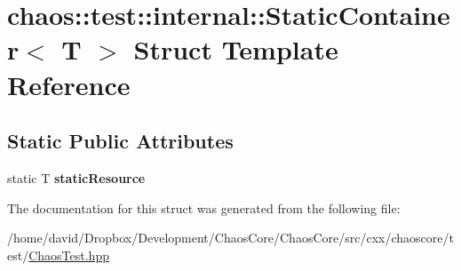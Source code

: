 \hypertarget{structchaos_1_1test_1_1internal_1_1_static_container}{\section{chaos\-:\-:test\-:\-:internal\-:\-:Static\-Container$<$ T $>$ Struct Template Reference}
\label{structchaos_1_1test_1_1internal_1_1_static_container}
}
\subsection*{Static Public Attributes}
\begin{DoxyCompactItemize}
\item 
\hypertarget{structchaos_1_1test_1_1internal_1_1_static_container_a1e323a7f271ae9d3c9540d0c7899e0de}{static T {\bfseries static\-Resource}}\label{structchaos_1_1test_1_1internal_1_1_static_container_a1e323a7f271ae9d3c9540d0c7899e0de}

\end{DoxyCompactItemize}


The documentation for this struct was generated from the following file\-:\begin{DoxyCompactItemize}
\item 
/home/david/\-Dropbox/\-Development/\-Chaos\-Core/\-Chaos\-Core/src/cxx/chaoscore/test/\hyperlink{_chaos_test_8hpp}{Chaos\-Test.\-hpp}\end{DoxyCompactItemize}
